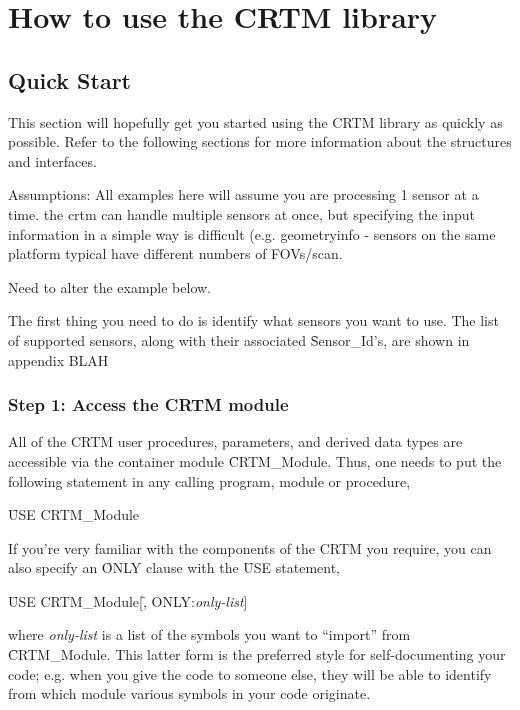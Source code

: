 \chapter{How to use the CRTM library}
\section{Quick Start}
This section will hopefully get you started using the CRTM library as quickly as possible. Refer to the following sections for more information about the structures and interfaces.

Assumptions:
All examples here will assume you are processing 1 sensor at a time. the crtm can handle multiple sensors at once, but specifying the input information in a simple way is difficult (e.g. geometryinfo - sensors on the same platform typical have different numbers of FOVs/scan.


Need to alter the example below.

The first thing you need to do is identify what sensors you want to use. The list of supported sensors, along with their associated \f{Sensor\_Id}'s, are shown in appendix BLAH



\subsection{Step 1: Access the CRTM module}
All of the CRTM user procedures, parameters, and derived data types are accessible via the container module \f{CRTM\_Module}. Thus, one needs to put the following statement in any calling program, module or procedure,

\qquad\f{USE CRTM\_Module}

If you're very familiar with the components of the CRTM you require, you can also specify an \f{ONLY} clause with the \f{USE} statement,

\qquad\f{USE CRTM\_Module}[\f{, ONLY:}\textit{only-list}]

where \textit{only-list} is a list of the symbols you want to ``import'' from \f{CRTM\_Module}. This latter form is the preferred style for self-documenting your code; e.g. when you give the code to someone else, they will be able to identify from which module various symbols in your code originate.

